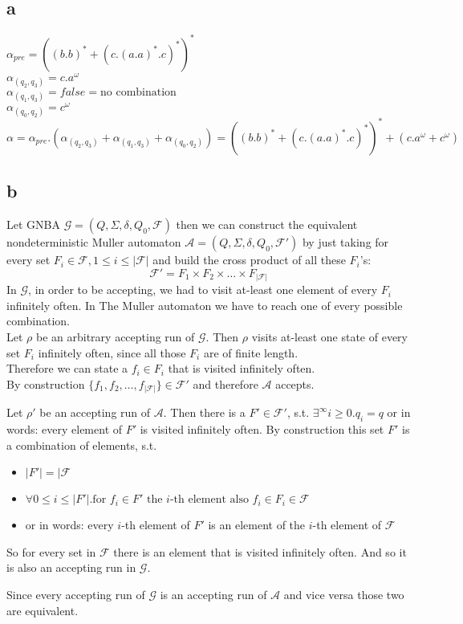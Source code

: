 \documentclass[11pt]{article}
\begin{document}
\subsection{a}
$\alpha_{pre} = ((b.b)^* + (c.(a.a)^*.c)^*)^*$\\
$\alpha_{(q_2,q_3)} = c.a^\omega$\\
$\alpha_{(q_1,q_3)} = false = \text{no combination}$\\
$\alpha_{(q_0,q_2)} = c^\omega$\\
$\alpha = \alpha_{pre} . (\alpha_{(q_2,q_3)} +\alpha_{(q_1,q_3)} +\alpha_{(q_0,q_2)}) = ((b.b)^* + (c.(a.a)^*.c)^*)^*+(c.a^\omega+c^\omega)$

\subsection{b}
Let GNBA $\mathcal{G}=(Q,\Sigma,\delta, Q_0, \mathcal{F})$ then we can construct the equivalent nondeterministic Muller automaton $\mathcal{A} = (Q, \Sigma, \delta, Q_0, \mathcal{F}')$ by just taking for every set $F_i\in\mathcal{F}, 1\le i\le |\mathcal{F}|$ and build the cross product of all these $F_i$'s:
	$$\mathcal{F}' =  F_1 \times F_2 \times \dots \times F_{|\mathcal{F}|}$$
In $\mathcal{G}$, in order to be accepting, we had to visit at-least one element of every $F_i$ infinitely often. In The Muller automaton we have to reach one of every possible combination.\\

Let $\rho$ be an arbitrary accepting run of $\mathcal{G}$. Then $\rho$ visits at-least one state of every set $F_i$ infinitely often, since all those $F_i$ are of finite length.\\
Therefore we can state a $f_i \in F_i$ that is visited infinitely often.\\
By construction $\{f_1,f_2,\dots, f_{|\mathcal{F}|}\} \in \mathcal{F}'$ and therefore $\mathcal{A}$ accepts.

Let $\rho'$ be an accepting run of $\mathcal{A}$. Then there is a $F'\in \mathcal{F}'$, s.t. $\exists^\infty i \ge 0. q_i = q$ or in words: every element of $F'$ is visited infinitely often. By construction this set $F'$ is a combination of elements, s.t.
\begin{itemize}
	\item $|F'| = |\mathcal{F}$
	\item $\forall 0\le i \le |F'|. \text{for }f_i \in F'  \text{ the }i\text{-th element also } f_i \in F_i \in \mathcal{F}$
	\item[] or in words: every $i$-th element of $F'$ is an element of the $i$-th element of $\mathcal{F}$
\end{itemize} 

So for every set in $\mathcal{F}$ there is an element that is visited infinitely often. And so it is also an accepting run in $\mathcal{G}$.

Since every accepting run of $\mathcal{G}$ is an accepting run of $\mathcal{A}$ and vice versa those two are equivalent.
\end{document}
